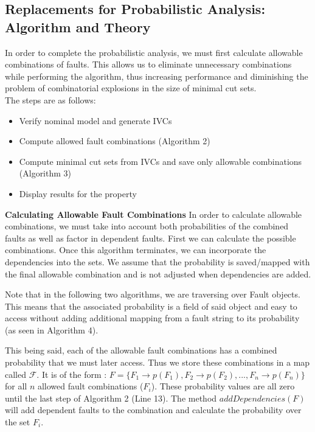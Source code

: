 \subsection{Replacements for Probabilistic Analysis: Algorithm and Theory}
In order to complete the probabilistic analysis, we must first calculate allowable combinations of faults. This allows us to eliminate unnecessary combinations while performing the algorithm, thus increasing performance and diminishing the problem of combinatorial explosions in the size of minimal cut sets. \\

The steps are as follows:\\
\begin{itemize}
\item Verify nominal model and generate IVCs
\item Compute allowed fault combinations (Algorithm 2)
\item Compute minimal cut sets from IVCs and save only allowable combinations (Algorithm 3)
\item Display results for the property
\end{itemize}

\textbf{Calculating Allowable Fault Combinations}
In order to calculate allowable combinations, we must take into account both probabilities of the combined faults as well as factor in dependent faults. First we can calculate the possible combinations. Once this algorithm terminates, we can incorporate the dependencies into the sets. We assume that the probability is saved/mapped with the final allowable combination and is not adjusted when dependencies are added. 

Note that in the following two algorithms, we are traversing over Fault objects. This means that the associated probability is a field of said object and easy to access without adding additional mapping from a fault string to its probability (as seen in Algorithm 4). 

This being said, each of the allowable fault combinations has a combined probability that we must later access. Thus we store these combinations in a map called $\mathcal{F}$. It is of the form : $F = \{F_1 \rightarrow p(F_1), F_2 \rightarrow p(F_2), ..., F_n \rightarrow p(F_n)\}$ for all $n$ allowed fault combinations ($F_i$). These probability values are all zero until the last step of Algorithm 2 (Line 13). The method $addDependencies(F)$ will add dependent faults to the combination and calculate the probability over the set $F_i$. \\ 

